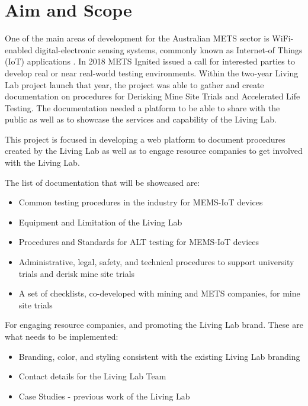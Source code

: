 \section{Aim and Scope}\label{scope}
One  of  the  main  areas  of  development  for  the  Australian  METS  sector  is  WiFi-enabled  digital-electronic  sensing  systems,  commonly  known  as  Internet-of  Things  (IoT)  applications . In  2018  METS  Ignited  issued a  call  for  interested  parties  to  develop  real  or  near  real-world testing environments. Within the two-year Living Lab project launch that year, the project was able to gather and create documentation on procedures for Derisking Mine Site Trials and Accelerated Life Testing. The documentation needed a platform to be able to share with the public as well as to showcase the services and capability of the Living Lab.

This project is focused in developing a web platform to document procedures created by the Living Lab as well as to engage resource companies to get involved with the Living Lab.

The list of documentation that will be showcased are:
\begin{itemize}
    \item Common testing procedures in the industry for MEMS-IoT devices
    \item Equipment and Limitation of the Living Lab
    \item Procedures and Standards for ALT testing for MEMS-IoT devices
    \item Administrative, legal, safety, and technical procedures to support university trials and derisk mine site trials
    \item A set of checklists, co-developed with mining and METS companies, for mine site trials
\end{itemize}
For engaging resource companies, and promoting the Living Lab brand. These are what needs to be implemented:
\begin{itemize}
    \item Branding, color, and styling consistent with the existing Living Lab branding
    \item Contact details for the Living Lab Team
    \item Case Studies - previous work of the Living Lab
\end{itemize}
